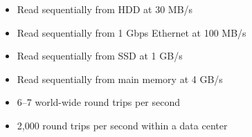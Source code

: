 \begin{summary}
    \begin{itemize}
        \item Read sequentially from HDD at 30 MB/s
        \item Read sequentially from 1 Gbps Ethernet at 100 MB/s
        \item Read sequentially from SSD at 1 GB/s
        \item Read sequentially from main memory at 4 GB/s
        \item 6--7 world-wide round trips per second
        \item 2,000 round trips per second within a data center
    \end{itemize}
\end{summary}
